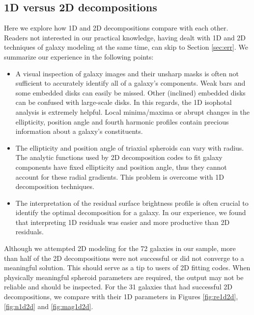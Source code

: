 \documentclass[preprint2]{emulateapj}
\begin{document}
\subsection{1D versus 2D decompositions}
Here we explore how 1D and 2D decompositions compare with each other. 
Readers not interested in our practical knowledge, 
having dealt with 1D and 2D techniques of galaxy modeling at the same time, can skip to Section \ref{sec:err}. 
We summarize our experience in the following points:
\begin{itemize}
\item A visual inspection of galaxy images and their unsharp masks is often not sufficient to accurately identify all of a galaxy's components. 
Weak bars and some embedded disks can easily be missed. 
Other (inclined) embedded disks can be confused with large-scale disks.
In this regards, the 1D isophotal analysis is extremely helpful. 
Local minima/maxima or abrupt changes in the ellipticity, position angle and fourth harmonic profiles contain precious information 
about a galaxy's constituents.
\item The ellipticity and position angle of triaxial spheroids can vary with radius.
The analytic functions used by 2D decomposition codes to fit galaxy components have fixed ellipticity and position angle, 
thus they cannot account for these radial gradients. 
This problem is overcome with 1D decomposition techniques.
\item The interpretation of the residual surface brightness profile is often crucial to identify the optimal decomposition for a galaxy. 
In our experience, we found that interpreting 1D residuals was easier and more productive than 2D residuals.
\end{itemize}
Although we attempted 2D modeling for the 72 galaxies in our sample, 
more than half of the 2D decompositions were not successful or did not converge to a meaningful solution. 
This should serve as a tip to users of 2D fitting codes. 
When physically meaningful spheroid parameters are required, 
the output may not be reliable and should be inspected.
For the 31 galaxies that had successful 2D decompositions, 
we compare with their 1D parameters in Figures \ref{fig:re1d2d}, \ref{fig:n1d2d} and \ref{fig:mag1d2d}.
\end{document}
